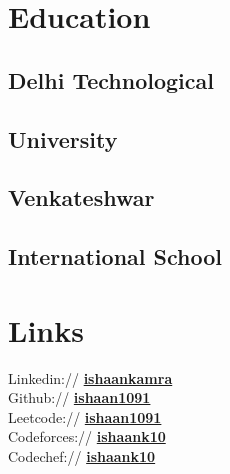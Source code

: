 \documentclass[]{ishaan-kamra-resume}
\begin{document}
\begin{minipage}[t]{0.33\textwidth} 


\section{Education} 

\subsection{Delhi Technological}
\subsection{University}
\sectionsep

\subsection{Venkateshwar}
\subsection{International School}
\sectionsep



\section{Links} 
Linkedin:// \href{https://www.linkedin.com/in/ishaankamra/}{\bf ishaankamra} \\
Github:// \href{https://github.com/ishaan1091}{\bf ishaan1091} \\
Leetcode://  \href{https://leetcode.com/ishaan1091/}{\bf ishaan1091} \\
Codeforces://  \href{https://codeforces.com/profile/ishaank10}{\bf ishaank10} \\
Codechef://  \href{https://www.codechef.com/users/ishaank10}{\bf ishaank10}



\end{minipage}
\end{document}
